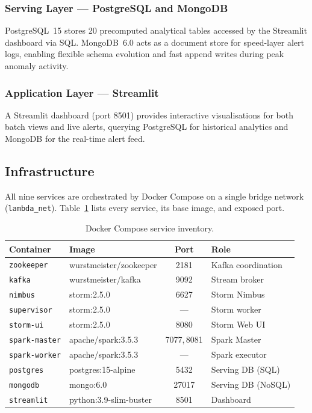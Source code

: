\documentclass[11pt,a4paper]{article}
\begin{document}
\subsubsection{Serving Layer — PostgreSQL and MongoDB}
PostgreSQL~15 stores 20 precomputed analytical tables accessed by the
Streamlit dashboard via SQL. MongoDB~6.0 acts as a document store for
speed-layer alert logs, enabling flexible schema evolution and fast
append writes during peak anomaly activity.

\subsubsection{Application Layer — Streamlit}
A Streamlit dashboard (port 8501) provides interactive visualisations
for both batch views and live alerts, querying PostgreSQL for historical
analytics and MongoDB for the real-time alert feed.

\subsection{Infrastructure}
All nine services are orchestrated by Docker Compose on a single bridge
network (\texttt{lambda\_net}). Table~\ref{tab:services} lists every
service, its base image, and exposed port.

\begin{table}[H]
\centering
\caption{Docker Compose service inventory.}
\label{tab:services}
\begin{tabular}{@{}llcl@{}}
\toprule
\textbf{Container} & \textbf{Image} & \textbf{Port} & \textbf{Role} \\
\midrule
\texttt{zookeeper}    & wurstmeister/zookeeper  & 2181 & Kafka coordination \\
\texttt{kafka}        & wurstmeister/kafka      & 9092 & Stream broker \\
\texttt{nimbus}       & storm:2.5.0             & 6627 & Storm Nimbus \\
\texttt{supervisor}   & storm:2.5.0             & —    & Storm worker \\
\texttt{storm-ui}     & storm:2.5.0             & 8080 & Storm Web UI \\
\texttt{spark-master} & apache/spark:3.5.3      & 7077,\,8081 & Spark Master \\
\texttt{spark-worker} & apache/spark:3.5.3      & —    & Spark executor \\
\texttt{postgres}     & postgres:15-alpine      & 5432 & Serving DB (SQL) \\
\texttt{mongodb}      & mongo:6.0               & 27017 & Serving DB (NoSQL) \\
\texttt{streamlit}    & python:3.9-slim-buster  & 8501 & Dashboard \\
\bottomrule
\end{tabular}
\end{table}
\end{document}

